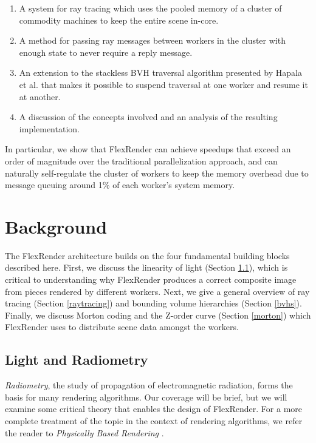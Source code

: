 \documentclass[12pt]{ucthesis}
\begin{document}
\begin{enumerate}
    \item A system for ray tracing which uses the pooled memory of a cluster of
        commodity machines to keep the entire scene in-core.
    \item A method for passing ray messages between workers in the cluster with
        enough state to never require a reply message.
    \item An extension to the stackless BVH traversal algorithm presented by
        Hapala et al. \cite{hapala:2011} that makes it possible to suspend
        traversal at one worker and resume it at another.
    \item A discussion of the concepts involved and an analysis of the resulting
        implementation.
\end{enumerate}

In particular, we show that FlexRender can achieve speedups that exceed an
order of magnitude over the traditional parallelization approach, and can
naturally self-regulate the cluster of workers to keep the memory overhead due
to message queuing around 1\% of each worker's system memory.

\chapter{Background}
\label{background}

The FlexRender architecture builds on the four fundamental building blocks
described here. First, we discuss the linearity of light (Section \ref{radiometry}),
which is critical to understanding why FlexRender produces a correct composite
image from pieces rendered by different workers. Next, we give a general
overview of ray tracing (Section \ref{raytracing}) and bounding volume hierarchies
(Section \ref{bvhs}). Finally, we discuss Morton coding and the Z-order curve
(Section \ref{morton}) which FlexRender uses to distribute scene data amongst the
workers.

\section{Light and Radiometry}
\label{radiometry}

\emph{Radiometry}, the study of propagation of electromagnetic radiation, forms
the basis for many rendering algorithms. Our coverage will be brief, but we will
examine some critical theory that enables the design of FlexRender. For a more
complete treatment of the topic in the context of rendering algorithms, we refer
the reader to \emph{Physically Based Rendering} \cite{pbrt}.
\end{document}
